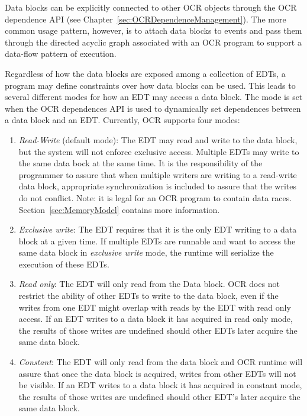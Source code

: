 Data blocks can be explicitly connected to other OCR objects through the OCR
dependence API (see Chapter~\ref{sec:OCRDependenceManagement}).
The more common usage pattern, however, is
to attach data blocks to events and pass them through the
directed acyclic graph associated with an OCR program to support a
data-flow pattern of execution.

Regardless of how the data blocks are exposed among a collection of
EDTs, a program may define constraints over how data
blocks can be used. This leads to several different modes for how an
EDT may access a data block. The mode is set when the OCR dependences
API is used to dynamically set dependences between a data block and an
EDT. Currently, OCR supports four modes:
\begin{enumerate}
\item \emph{Read-Write} (default mode): The EDT may read
  and write to the data block, but the system will not enforce exclusive
  access. Multiple EDTs may write to the same data bock at the same
  time. It is the responsibility of the programmer to
  assure that when multiple writers are writing to a read-write data block,
  appropriate synchronization
  is included to assure that the writes do not conflict.  Note: it is
  legal for an OCR program to contain data
  races. Section~\ref{sec:MemoryModel} contains more information.

\item \emph{Exclusive write}: The
  EDT requires that it is the only EDT writing to a data block at a
  given time. If multiple EDTs are runnable and want to access the same
  data block in \emph{exclusive write} mode, the runtime will serialize
  the execution of these EDTs.

\item \emph{Read only}: The EDT
  will only read from the Data block. OCR does
  not restrict the ability of other EDTs to write to the data block,
  even if the writes from one EDT might overlap with reads by the EDT
  with read only access. If an EDT writes to a data block
  it has acquired in read only mode, the results of those writes are
  undefined should other EDTs later acquire the same data block.

\item \emph{Constant}: The EDT will only
  read from the data block and OCR runtime will assure that once the
  data block is acquired, writes from other EDTs will not be visible.
  If an EDT writes to a data block it has acquired in constant mode,
  the results of those writes are undefined should other EDT's later
  acquire the same data block.
\end{enumerate}

